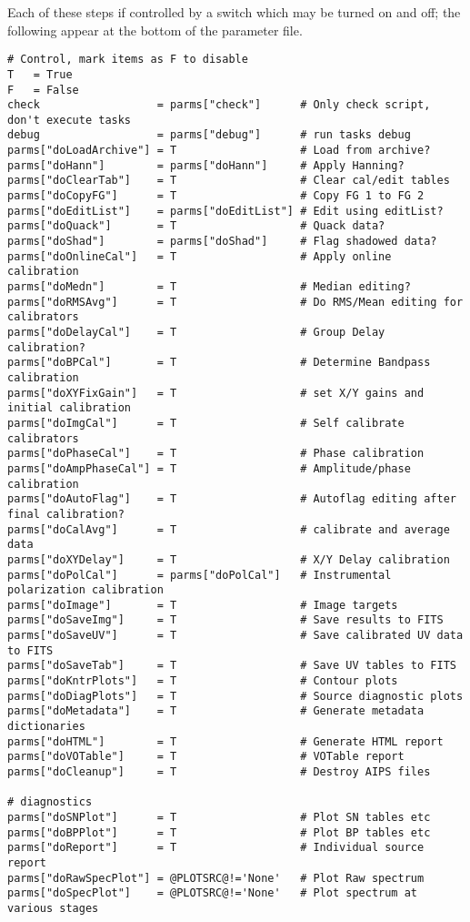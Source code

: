 \documentclass[11pt]{article}
\begin{document}
Each of these steps if controlled by a switch which may be turned on
and off; the following appear at the bottom of the parameter file.
\begin{verbatim}
# Control, mark items as F to disable
T   = True
F   = False
check                  = parms["check"]      # Only check script, don't execute tasks
debug                  = parms["debug"]      # run tasks debug
parms["doLoadArchive"] = T                   # Load from archive?
parms["doHann"]        = parms["doHann"]     # Apply Hanning?
parms["doClearTab"]    = T                   # Clear cal/edit tables
parms["doCopyFG"]      = T                   # Copy FG 1 to FG 2
parms["doEditList"]    = parms["doEditList"] # Edit using editList?
parms["doQuack"]       = T                   # Quack data?
parms["doShad"]        = parms["doShad"]     # Flag shadowed data?
parms["doOnlineCal"]   = T                   # Apply online calibration
parms["doMedn"]        = T                   # Median editing?
parms["doRMSAvg"]      = T                   # Do RMS/Mean editing for calibrators
parms["doDelayCal"]    = T                   # Group Delay calibration?
parms["doBPCal"]       = T                   # Determine Bandpass calibration
parms["doXYFixGain"]   = T                   # set X/Y gains and initial calibration
parms["doImgCal"]      = T                   # Self calibrate calibrators
parms["doPhaseCal"]    = T                   # Phase calibration
parms["doAmpPhaseCal"] = T                   # Amplitude/phase calibration
parms["doAutoFlag"]    = T                   # Autoflag editing after final calibration?
parms["doCalAvg"]      = T                   # calibrate and average data
parms["doXYDelay"]     = T                   # X/Y Delay calibration
parms["doPolCal"]      = parms["doPolCal"]   # Instrumental polarization calibration
parms["doImage"]       = T                   # Image targets
parms["doSaveImg"]     = T                   # Save results to FITS
parms["doSaveUV"]      = T                   # Save calibrated UV data to FITS
parms["doSaveTab"]     = T                   # Save UV tables to FITS
parms["doKntrPlots"]   = T                   # Contour plots
parms["doDiagPlots"]   = T                   # Source diagnostic plots
parms["doMetadata"]    = T                   # Generate metadata dictionaries
parms["doHTML"]        = T                   # Generate HTML report
parms["doVOTable"]     = T                   # VOTable report
parms["doCleanup"]     = T                   # Destroy AIPS files

# diagnostics
parms["doSNPlot"]      = T                   # Plot SN tables etc
parms["doBPPlot"]      = T                   # Plot BP tables etc
parms["doReport"]      = T                   # Individual source report
parms["doRawSpecPlot"] = @PLOTSRC@!='None'   # Plot Raw spectrum
parms["doSpecPlot"]    = @PLOTSRC@!='None'   # Plot spectrum at various stages
\end{verbatim}
\end{document}
